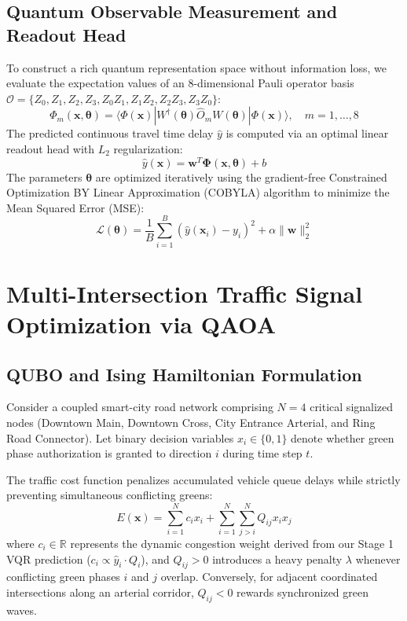 \documentclass[journal,twoside]{IEEEtran}
\begin{document}
\subsection{Quantum Observable Measurement and Readout Head}
To construct a rich quantum representation space without information loss, we evaluate the expectation values of an 8-dimensional Pauli operator basis $\mathcal{O} = \{Z_0, Z_1, Z_2, Z_3, Z_0 Z_1, Z_1 Z_2, Z_2 Z_3, Z_3 Z_0\}$:
\begin{equation}
    \Phi_m(\mathbf{x}, \bm{\theta}) = \langle \Phi(\mathbf{x}) | W^\dagger(\bm{\theta}) \hat{O}_m W(\bm{\theta}) | \Phi(\mathbf{x}) \rangle, \quad m=1,\dots,8
\end{equation}
The predicted continuous travel time delay $\hat{y}$ is computed via an optimal linear readout head with $L_2$ regularization:
\begin{equation}
    \hat{y}(\mathbf{x}) = \mathbf{w}^T \bm{\Phi}(\mathbf{x}, \bm{\theta}) + b
\end{equation}
The parameters $\bm{\theta}$ are optimized iteratively using the gradient-free Constrained Optimization BY Linear Approximation (COBYLA) algorithm to minimize the Mean Squared Error (MSE):
\begin{equation}
    \mathcal{L}(\bm{\theta}) = \frac{1}{B} \sum_{i=1}^B \left( \hat{y}(\mathbf{x}_i) - y_i \right)^2 + \alpha \|\mathbf{w}\|_2^2
\end{equation}

\section{Multi-Intersection Traffic Signal Optimization via QAOA}

\subsection{QUBO and Ising Hamiltonian Formulation}
Consider a coupled smart-city road network comprising $N=4$ critical signalized nodes (Downtown Main, Downtown Cross, City Entrance Arterial, and Ring Road Connector). Let binary decision variables $x_i \in \{0, 1\}$ denote whether green phase authorization is granted to direction $i$ during time step $t$.

The traffic cost function penalizes accumulated vehicle queue delays while strictly preventing simultaneous conflicting greens:
\begin{equation}
    E(\mathbf{x}) = \sum_{i=1}^N c_i x_i + \sum_{i=1}^N \sum_{j > i}^N Q_{ij} x_i x_j
\end{equation}
where $c_i \in \mathbb{R}$ represents the dynamic congestion weight derived from our Stage 1 VQR prediction ($c_i \propto \hat{y}_i \cdot Q_i$), and $Q_{ij} > 0$ introduces a heavy penalty $\lambda$ whenever conflicting green phases $i$ and $j$ overlap. Conversely, for adjacent coordinated intersections along an arterial corridor, $Q_{ij} < 0$ rewards synchronized green waves.
\end{document}
